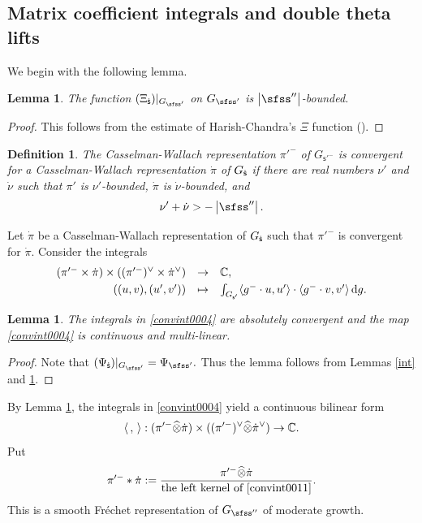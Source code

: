 \documentclass[11pt,a4paper]{amsart}
\def\abs#1{\left|{#1}\right|}
\newcommand{\od}{\operatorname{d}}
\newcommand{\la}{\langle}
\newcommand{\ra}{\rangle}
\newcommand{\be}{\begin {equation}}
\newcommand{\ee}{\end {equation}}
\numberwithin{equation}{section}
\newtheorem{lem}[thm]{Lemma}
\newtheorem{defn}[thm]{Definition}
\theoremstyle{remark}
\begin{document}
\subsection{Matrix coefficient integrals and double theta lifts}

We begin with the following lemma.

\begin{lem}\label{boundxx}
The function $(\Xi_\dsfss)|_{G_{\sfss'}}$ on $G_{\sfss'}$  is   $\abs{\sfss''}$-bounded.
\end{lem}
\begin{proof}
This follows from the  estimate of Harish-Chandra's $\Xi$ function (\cite[Theorem 4.5.3]{Wa1}).
\end{proof}


 \begin{defn}\label{defn:CR}
The Casselman-Wallach representation  $\pi'^-$ of $G_{\mathsf s'^-}$ is convergent  for a Casselman-Wallach representation  $\dot \pi$ of $G_{{\dot{\mathsf s}}}$ if there are real numbers $\nu'$ and $\dot \nu$ such that $\pi'$ is $\nu'$-bounded, $\dot \pi$ is $\dot \nu$-bounded, and
\[
  \nu'+\dot \nu>-\abs{\sfss''}.
\]
\end{defn}

Let $\dot \pi$  be a Casselman-Wallach representation of $G_{{\dot{\mathsf s}}}$ such that $\pi'^-$  is convergent  for  $\dot \pi$.
Consider the integrals
\be\label{convint0004}
\begin{array}{rcl}
 (\pi'^- \times \dot \pi)\times ((\pi'^-)^\vee \times \dot \pi^\vee )&\rightarrow &\C, \smallskip \\
   ((u,v),(u',v')) &\mapsto &\int_{G_{\mathsf s'}} \la g^-\cdot u, u'\ra\cdot \la g^-\cdot v, v'\ra \od\! g.
   \end{array}
 \ee

\begin{lem}\label{intpi0004}
The integrals in \eqref{convint0004} are absolutely convergent and the map \eqref{convint0004} is   continuous and multi-linear.
\end{lem}
\begin{proof}
Note that
$
  (\Psi_{\dsfss})|_{G_{\sfss'}}=\Psi_{\sfss'}.
$
Thus the lemma follows from Lemmas \ref{int} and \ref{boundxx}.
\end{proof}



By Lemma \ref{intpi0004}, the integrals in \eqref{convint0004} yield a continuous bilinear form
\be\label{convint0011}
 \la\,,\,\ra: (\pi'^- \widehat \otimes{ \dot \pi})\times ((\pi'^-)^\vee \widehat \otimes {\dot \pi}^\vee )\rightarrow \C.
 \ee
Put
\begin{equation}\label{theta.gen}
 \pi'^-*\dot \pi:=\frac{\pi'^-\widehat \otimes \dot \pi}{\textrm{the left kernel of \eqref{convint0011}}}.
\end{equation}
This is a smooth Fr\'echet representation of $G_{\sfss''}$ of moderate growth.
\end{document}
